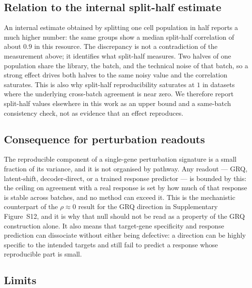 \documentclass[11pt,a4paper]{article}
\begin{document}
\subsection*{Relation to the internal split-half estimate}

An internal estimate obtained by splitting one cell population in half reports a much higher
number: the same groups show a median split-half correlation of about $0.9$ in this resource. The
discrepancy is not a contradiction of the measurement above; it identifies what split-half measures.
Two halves of one population share the library, the batch, and the technical noise of that batch,
so a strong effect drives both halves to the same noisy value and the correlation saturates. This
is also why split-half reproducibility saturates at $1$ in datasets where the underlying
cross-batch agreement is near zero. We therefore report split-half values elsewhere in this work as
an upper bound and a same-batch consistency check, not as evidence that an effect reproduces.

\subsection*{Consequence for perturbation readouts}

The reproducible component of a single-gene perturbation signature is a small fraction of its
variance, and it is not organised by pathway. Any readout --- GRQ, latent-shift, decoder-direct, or
a trained response predictor --- is bounded by this: the ceiling on agreement with a real response
is set by how much of that response is stable across batches, and no method can exceed it. This is
the mechanistic counterpart of the $\rho\approx0$ result for the GRQ direction in Supplementary
Figure~S12, and it is why that null should not be read as a property of the GRQ construction alone.
It also means that target-gene specificity and response prediction can dissociate without either
being defective: a direction can be highly specific to the intended targets and still fail to
predict a response whose reproducible part is small.

\subsection*{Limits}
\end{document}

